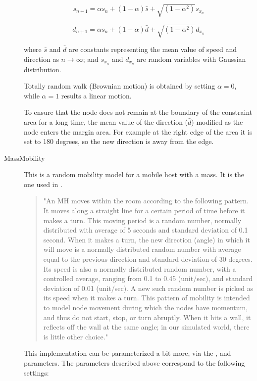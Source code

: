 \begin{description}
$$ s_{n+1} = \alpha s_n + (1 - \alpha) \bar{s} +
             \sqrt{(1-\alpha^2)} s_{x_n} $$

$$ d_{n+1} = \alpha s_n + (1 - \alpha) \bar{d} +
             \sqrt{(1-\alpha^2)} d_{x_n} $$

where $\bar{s}$ and $\bar{d}$ are constants representing the mean value
of speed and direction as $n \to \infty$; and $s_{x_n}$ and $d_{x_n}$
are random variables with Gaussian distribution.

Totally random walk (Brownian motion) is obtained by setting $\alpha=0$,
while $\alpha=1$ results a linear motion.

To ensure that the node does not remain at the boundary of the constraint
area for a long time, the mean value of the direction ($\bar{d}$) modified
as the node enters the margin area. For example at the right edge of the
area it is set to 180 degrees, so the new direction is away from the edge.


\item[MassMobility]

This is a random mobility model for a mobile host with
a mass. It is the one used in \cite{Perkins99optimizedsmooth}.

\begin{quote}
"An MH moves within the room according to the following pattern. It moves
along a straight line for a certain period of time before it makes a turn.
This moving period is a random number, normally distributed with average of
5 seconds and standard deviation of 0.1 second. When it makes a turn, the
new direction (angle) in which it will move is a normally distributed
random number with average equal to the previous direction and standard
deviation of 30 degrees. Its speed is also a normally distributed random
number, with a controlled average, ranging from 0.1 to 0.45 (unit/sec), and
standard deviation of 0.01 (unit/sec). A new such random number is picked
as its speed when it makes a turn. This pattern of mobility is intended to
model node movement during which the nodes have momentum, and thus do not
start, stop, or turn abruptly. When it hits a wall, it reflects off the
wall at the same angle; in our simulated world, there is little other
choice."
\end{quote}

This implementation can be parameterized a bit more, via the
,  and  parameters.
The parameters described above correspond to the following settings:


\end{description}
